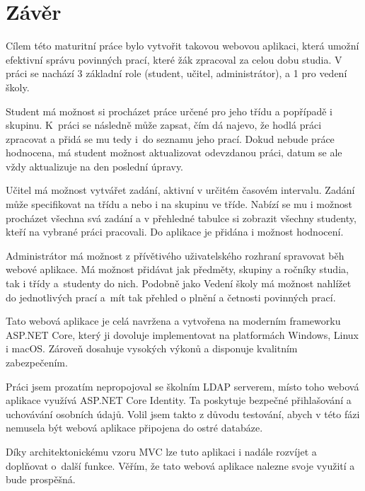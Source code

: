 \documentclass[a4paper, 12pt]{report}
\begin{document}
	\chapter{Závěr}
	Cílem této maturitní práce bylo vytvořit takovou webovou aplikaci, která umožní efektivní správu povinných prací, které žák zpracoval za celou dobu studia. V práci se nachází 3 základní role (student, učitel, administrátor), a 1 pro vedení školy.\par
	Student má možnost si procházet práce určené pro jeho třídu a popřípadě i skupinu. K~práci se následně může zapsat, čím dá najevo, že hodlá práci zpracovat a přidá se mu tedy i~do seznamu jeho prací. Dokud nebude práce hodnocena, má student možnost aktualizovat odevzdanou práci, datum se ale vždy aktualizuje na den poslední úpravy.\par
	Učitel má možnost vytvářet zadání, aktivní v určitém časovém intervalu. Zadání může specifikovat na třídu a nebo i na skupinu ve tříde.	Nabízí se mu i možnost procházet všechna svá zadání a v přehledné tabulce si zobrazit všechny studenty, kteří na vybrané práci pracovali. Do aplikace je přidána i možnost hodnocení.\par
	Administrátor má možnost z přívětivého uživatelského rozhraní spravovat běh webové aplikace. Má možnost přidávat jak předměty, skupiny a ročníky studia, tak i třídy a~studenty do nich. Podobně jako Vedení školy má možnost nahlížet do jednotlivých prací a~mít tak přehled o plnění a četnosti povinných prací.\par
	Tato webová aplikace je celá navržena a vytvořena na moderním frameworku ASP.NET Core, který ji dovoluje implementovat na platformách Windows, Linux i macOS. Zároveň dosahuje vysokých výkonů a disponuje kvalitním zabezpečením.\par
	Práci jsem prozatím nepropojoval se školním LDAP serverem, místo toho webová aplikace využívá ASP.NET Core Identity. Ta poskytuje bezpečné přihlašování a uchovávání osobních údajů. Volil jsem takto z důvodu testování, abych v této fázi nemusela být webová aplikace připojena do ostré databáze.\par
	Díky architektonickému vzoru MVC lze tuto aplikaci i nadále rozvíjet a doplňovat o~další funkce. Věřím, že tato webová aplikace nalezne svoje využití a bude prospěšná.

	\seznamObrazku

	\renewcommand\listoflistingscaption{Seznam zdrojových kódů}
	\listoflistings


	
	

\end{document}
